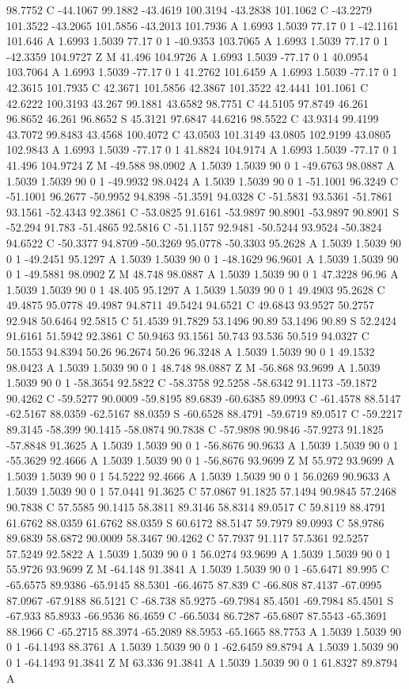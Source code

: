{{{98.7752 C -44.1067 99.1882 -43.4619 100.3194 -43.2838 101.1062 C -43.2279 101.3522 -43.2065 101.5856 -43.2013 101.7936 A 1.6993 1.5039 77.17 0 1 -42.1161 101.646 A 1.6993 1.5039 77.17 0 1 -40.9353 103.7065 A 1.6993 1.5039 77.17 0 1 -42.3359 104.9727 Z M 41.496 104.9726 A 1.6993 1.5039 -77.17 0 1 40.0954 103.7064 A 1.6993 1.5039 -77.17 0 1 41.2762 101.6459 A 1.6993 1.5039 -77.17 0 1 42.3615 101.7935 C 42.3671 101.5856 42.3867 101.3522 42.4441 101.1061 C 42.6222 100.3193 43.267 99.1881 43.6582 98.7751 C 44.5105 97.8749 46.261 96.8652 46.261 96.8652 S 45.3121 97.6847 44.6216 98.5522 C 43.9314 99.4199 43.7072 99.8483 43.4568 100.4072 C 43.0503 101.3149 43.0805 102.9199 43.0805 102.9843 A 1.6993 1.5039 -77.17 0 1 41.8824 104.9174 A 1.6993 1.5039 -77.17 0 1 41.496 104.9724 Z M -49.588 98.0902 A 1.5039 1.5039 90 0 1 -49.6763 98.0887 A 1.5039 1.5039 90 0 1 -49.9932 98.0424 A 1.5039 1.5039 90 0 1 -51.1001 96.3249 C -51.1001 96.2677 -50.9952 94.8398 -51.3591 94.0328 C -51.5831 93.5361 -51.7861 93.1561 -52.4343 92.3861 C -53.0825 91.6161 -53.9897 90.8901 -53.9897 90.8901 S -52.294 91.783 -51.4865 92.5816 C -51.1157 92.9481 -50.5244 93.9524 -50.3824 94.6522 C -50.3377 94.8709 -50.3269 95.0778 -50.3303 95.2628 A 1.5039 1.5039 90 0 1 -49.2451 95.1297 A 1.5039 1.5039 90 0 1 -48.1629 96.9601 A 1.5039 1.5039 90 0 1 -49.5881 98.0902 Z M 48.748 98.0887 A 1.5039 1.5039 90 0 1 47.3228 96.96 A 1.5039 1.5039 90 0 1 48.405 95.1297 A 1.5039 1.5039 90 0 1 49.4903 95.2628 C 49.4875 95.0778 49.4987 94.8711 49.5424 94.6521 C 49.6843 93.9527 50.2757 92.948 50.6464 92.5815 C 51.4539 91.7829 53.1496 90.89 53.1496 90.89 S 52.2424 91.6161 51.5942 92.3861 C 50.9463 93.1561 50.743 93.536 50.519 94.0327 C 50.1553 94.8394 50.26 96.2674 50.26 96.3248 A 1.5039 1.5039 90 0 1 49.1532 98.0423 A 1.5039 1.5039 90 0 1 48.748 98.0887 Z M -56.868 93.9699 A 1.5039 1.5039 90 0 1 -58.3654 92.5822 C -58.3758 92.5258 -58.6342 91.1173 -59.1872 90.4262 C -59.5277 90.0009 -59.8195 89.6839 -60.6385 89.0993 C -61.4578 88.5147 -62.5167 88.0359 -62.5167 88.0359 S -60.6528 88.4791 -59.6719 89.0517 C -59.2217 89.3145 -58.399 90.1415 -58.0874 90.7838 C -57.9898 90.9846 -57.9273 91.1825 -57.8848 91.3625 A 1.5039 1.5039 90 0 1 -56.8676 90.9633 A 1.5039 1.5039 90 0 1 -55.3629 92.4666 A 1.5039 1.5039 90 0 1 -56.8676 93.9699 Z M 55.972 93.9699 A 1.5039 1.5039 90 0 1 54.5222 92.4666 A 1.5039 1.5039 90 0 1 56.0269 90.9633 A 1.5039 1.5039 90 0 1 57.0441 91.3625 C 57.0867 91.1825 57.1494 90.9845 57.2468 90.7838 C 57.5585 90.1415 58.3811 89.3146 58.8314 89.0517 C 59.8119 88.4791 61.6762 88.0359 61.6762 88.0359 S 60.6172 88.5147 59.7979 89.0993 C 58.9786 89.6839 58.6872 90.0009 58.3467 90.4262 C 57.7937 91.117 57.5361 92.5257 57.5249 92.5822 A 1.5039 1.5039 90 0 1 56.0274 93.9699 A 1.5039 1.5039 90 0 1 55.9726 93.9699 Z M -64.148 91.3841 A 1.5039 1.5039 90 0 1 -65.6471 89.995 C -65.6575 89.9386 -65.9145 88.5301 -66.4675 87.839 C -66.808 87.4137 -67.0995 87.0967 -67.9188 86.5121 C -68.738 85.9275 -69.7984 85.4501 -69.7984 85.4501 S -67.933 85.8933 -66.9536 86.4659 C -66.5034 86.7287 -65.6807 87.5543 -65.3691 88.1966 C -65.2715 88.3974 -65.2089 88.5953 -65.1665 88.7753 A 1.5039 1.5039 90 0 1 -64.1493 88.3761 A 1.5039 1.5039 90 0 1 -62.6459 89.8794 A 1.5039 1.5039 90 0 1 -64.1493 91.3841 Z M 63.336 91.3841 A 1.5039 1.5039 90 0 1 61.8327 89.8794 A }}}
